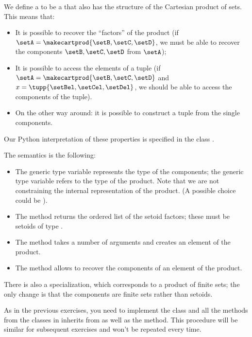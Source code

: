 
We define a  to be a \Setoid that also has the structure of the Cartesian product of sets.
This means that:
\begin{itemize}
    \item It is possible to recover the ``factors'' of the product (if $\setA = \makecartprod{\setB, \setC, \setD}$, we must be able to recover the components $\setB, \setC, \setD$ from $\setA$);
    \item It is possible to access the elements of a tuple (if $\setA = \makecartprod{\setB, \setC, \setD}$ and $x = \tupp{\setBel, \setCel, \setDel}$, we should be able to access the components of the tuple).
    \item On the other way around: it is possible to construct a tuple from the single components.
\end{itemize}
Our Python interpretation of these properties is specified in the class .


The semantics is the following:
\begin{itemize}
    \item The generic type variable  represents the type of the components; the generic type variable 
          refers to the type of the product.
          Note that we are not constraining the internal representation of the product.
          (A possible choice could be ).
    \item The method  returns the ordered list of the setoid factors; these must be setoids of type .
    \item The method  takes a number of arguments and creates an element of the product.
    \item The method  allows to recover the components of an element of the product.
\end{itemize}

There is also a specialization, which corresponds to a product of finite sets; the only change is that the components are finite sets rather than setoids.



As in the previous exercises, you need to implement the class  and all the methods from the classes in inherits from as well as the  method.
This procedure will be similar for subsequent exercises and won't be repeated every time.

